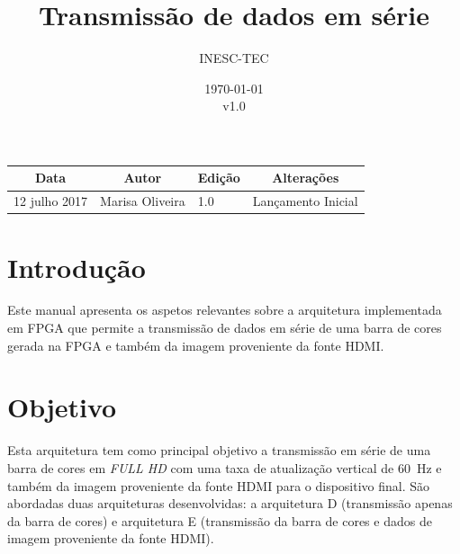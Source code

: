 \documentclass[11pt,a4paper]{article}
\title{Transmissão de dados em série} %
\author{INESC-TEC}
\date{\today \\ v1.0} %
\begin{document}
	
	\maketitle %
	
	\begin{table}[h!]
		\centering
		\label{my-label}
		\begin{tabular}{@{}llll@{}}
			\toprule
			\multicolumn{1}{c}{\textbf{Data}} & \multicolumn{1}{c}{\textbf{Autor}} & \multicolumn{1}{c}{\textbf{Edição}} & \multicolumn{1}{c}{\textbf{Alterações}} \\ \midrule
			12 julho 2017                     & Marisa Oliveira                    & 1.0                                 & Lançamento Inicial                       \\ \bottomrule
		\end{tabular}
	\end{table}
	
	
	
	\section{Introdução}
	
	Este manual apresenta os aspetos relevantes sobre a arquitetura implementada em FPGA que permite a transmissão de dados em série de uma barra de cores gerada na FPGA e também da imagem proveniente da fonte HDMI.
	
	\section{Objetivo}
	
	Esta arquitetura tem como principal objetivo a transmissão em série de uma barra de cores em \textit{FULL HD} com uma taxa de atualização vertical de \SI{60}{\hertz}  e também da imagem proveniente da fonte HDMI para o dispositivo final. São abordadas duas arquiteturas desenvolvidas: a arquitetura D (transmissão apenas da barra de cores) e arquitetura E (transmissão da barra de cores e dados de imagem proveniente da fonte HDMI).
	
\end{document}
